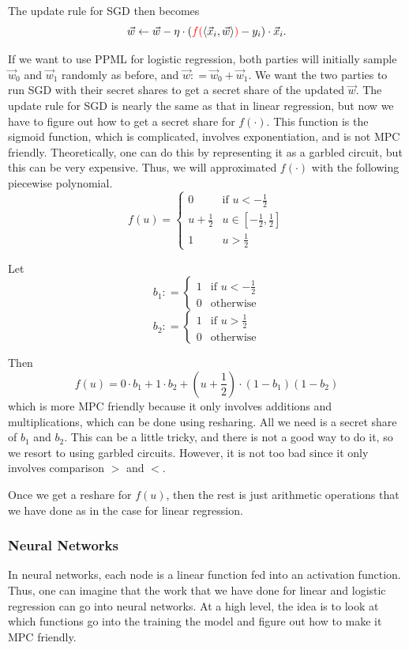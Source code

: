 The update rule for SGD then becomes
$$\vec{w} \gets \vec{w} - \eta \cdot ({\color{red} f(}\langle \vec{x}_i, \vec{w}\rangle{\color{red} )} - y_i)\cdot \vec{x}_i.$$

If we want to use PPML for logistic regression, both parties will initially sample $\vec{w}_0$ and $\vec{w}_1$ randomly as before, and $\vec{w}: = \vec{w}_0 + \vec{w}_1$. We want the two parties to run SGD with their secret shares to get a secret share of the updated $\vec{w}$. The update rule for SGD is nearly the same as that in linear regression, but now we have to figure out how to get a secret share for $f(\cdot)$. This function is the sigmoid function, which is complicated, involves exponentiation, and is not MPC friendly. Theoretically, one can do this by representing it as a garbled circuit, but this can be very expensive. Thus, we will approximated $f(\cdot)$ with the following piecewise polynomial.
$$f(u) = \begin{cases}
    0 & \text{if }u < -\frac{1}{2}\\
    u + \frac{1}{2} & u \in [-\frac{1}{2}, \frac{1}{2}]\\
    1 & u > \frac{1}{2}
\end{cases}$$

Let
$$b_1 : = \begin{cases}
    1 & \text{if }u < -\frac{1}{2}\\
    0 & \text{otherwise}
\end{cases}$$
$$b_2 : = \begin{cases}
    1 & \text{if }u > \frac{1}{2}\\
    0 & \text{otherwise}
\end{cases}$$

Then $$f(u) = 0 \cdot b_1 + 1 \cdot b_2 + (u + \frac{1}{2})\cdot (1-b_1)(1-b_2)$$
which is more MPC friendly because it only involves additions and multiplications, which can be done using resharing. All we need is a secret share of $b_1$ and $b_2$. This can be a little tricky, and there is not a good way to do it, so we resort to using garbled circuits. However, it is not too bad since it only involves comparison $>$ and $<$.

Once we get a reshare for $f(u)$, then the rest is just arithmetic operations that we have done as in the case for linear regression.

\subsubsection{Neural Networks}

In neural networks, each node is a linear function fed into an activation function. Thus, one can imagine that the work that we have done for linear and logistic regression can go into neural networks. At a high level, the idea is to look at which functions go into the training the model and figure out how to make it MPC friendly.
